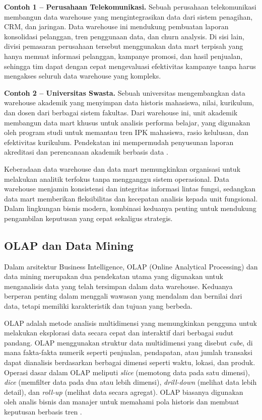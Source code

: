\textbf{Contoh 1 – Perusahaan Telekomunikasi.} Sebuah perusahaan telekomunikasi membangun data warehouse yang mengintegrasikan data dari sistem penagihan, CRM, dan jaringan. Data warehouse ini mendukung pembuatan laporan konsolidasi pelanggan, tren penggunaan data, dan churn analysis. Di sisi lain, divisi pemasaran perusahaan tersebut menggunakan data mart terpisah yang hanya memuat informasi pelanggan, kampanye promosi, dan hasil penjualan, sehingga tim dapat dengan cepat mengevaluasi efektivitas kampanye tanpa harus mengakses seluruh data warehouse yang kompleks.

\textbf{Contoh 2 – Universitas Swasta.} Sebuah universitas mengembangkan data warehouse akademik yang menyimpan data historis mahasiswa, nilai, kurikulum, dan dosen dari berbagai sistem fakultas. Dari warehouse ini, unit akademik membangun data mart khusus untuk analisis performa belajar, yang digunakan oleh program studi untuk memantau tren IPK mahasiswa, rasio kelulusan, dan efektivitas kurikulum. Pendekatan ini mempermudah penyusunan laporan akreditasi dan perencanaan akademik berbasis data \cite{glassey2018universitydw}.

Keberadaan data warehouse dan data mart memungkinkan organisasi untuk melakukan analitik terfokus tanpa mengganggu sistem operasional. Data warehouse menjamin konsistensi dan integritas informasi lintas fungsi, sedangkan data mart memberikan fleksibilitas dan kecepatan analisis kepada unit fungsional. Dalam lingkungan bisnis modern, kombinasi keduanya penting untuk mendukung pengambilan keputusan yang cepat sekaligus strategis.


\subsection{OLAP dan Data Mining}

Dalam arsitektur Business Intelligence, OLAP (Online Analytical Processing) dan data mining merupakan dua pendekatan utama yang digunakan untuk menganalisis data yang telah tersimpan dalam data warehouse. Keduanya berperan penting dalam menggali wawasan yang mendalam dan bernilai dari data, tetapi memiliki karakteristik dan tujuan yang berbeda.

OLAP adalah metode analisis multidimensi yang memungkinkan pengguna untuk melakukan eksplorasi data secara cepat dan interaktif dari berbagai sudut pandang. OLAP menggunakan struktur data multidimensi yang disebut \textit{cube}, di mana fakta-fakta numerik seperti penjualan, pendapatan, atau jumlah transaksi dapat dianalisis berdasarkan berbagai dimensi seperti waktu, lokasi, dan produk. Operasi dasar dalam OLAP meliputi \textit{slice} (memotong data pada satu dimensi), \textit{dice} (memfilter data pada dua atau lebih dimensi), \textit{drill-down} (melihat data lebih detail), dan \textit{roll-up} (melihat data secara agregat). OLAP biasanya digunakan oleh analis bisnis dan manajer untuk memahami pola historis dan membuat keputusan berbasis tren \cite{chaudhuri1997overview}.

